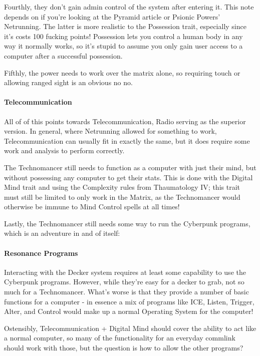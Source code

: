 \begin{multicols*}{2}
	Fourthly, they don't gain admin control of the system after entering it. This note depends on if you're looking at the Pyramid article or Psionic Powers' Netrunning. The latter is more realistic to the Possession trait, especially since it's costs 100 fucking points! Possession lets you control a human body in any way it normally works, so it's stupid to assume you only gain user access to a computer after a successful possession.
	
	Fifthly, the power needs to work over the matrix alone, so requiring touch or allowing ranged sight is an obvious no no.
	
	\paragraph{Telecommunication}
	
	All of of this points towards Telecommunication, Radio serving as the superior version. In general, where Netrunning allowed for something to work, Telecommunication can usually fit in exactly the same, but it does require some work and analysis to perform correctly. 
	
	The Technomancer still needs to function as a computer with just their mind, but without possessing any computer to get their stats. This is done with the Digital Mind trait and using the Complexity rules from Thaumatology IV; this trait must still be limited to only work in the Matrix, as the Technomancer would otherwise be immune to Mind Control spells at all times!
	
	Lastly, the Technomancer still needs some way to run the Cyberpunk programs, which is an adventure in and of itself:
	
	\paragraph{Resonance Programs}
	
	Interacting with the Decker system requires at least some capability to use the Cyberpunk programs. However, while they're easy for a decker to grab, not so much for a Technomancer. What's worse is that they provide a number of basic functions for a computer - in essence a mix of programs like ICE, Listen, Trigger, Alter, and Control would make up a normal Operating System for the computer!
	
	Ostensibly, Telecommunication + Digital Mind should cover the ability to act like a normal computer, so many of the functionality for an everyday commlink should work with those, but the question is how to allow the other programs?
	

\end{multicols*}
